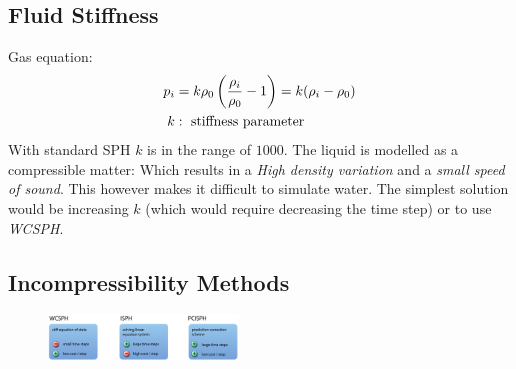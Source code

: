 \begin{multicols}{2}
\subsection{Fluid Stiffness}
Gas equation:
\begin{align*}
	p_i &= k\rho_0 \left({\rho_i \over \rho_0} - 1\right) = k(\rho_i-\rho_0)\\
	k &: \text{ stiffness parameter}
\end{align*}
With standard SPH $k$ is in the range of $1000$. The liquid is modelled as a compressible matter: Which results in a \emph{High density variation} and a \emph{small speed of sound}. This however makes it difficult to simulate water. The simplest solution would be increasing $k$ (which would require decreasing the time step) or to use \emph{WCSPH}.

\subsection{Incompressibility Methods}

\begin{figure}[H]
	\centering
	\includegraphics[width=0.45\textwidth]{img/05_incompressibility_methods}
\end{figure}


 


\end{multicols}